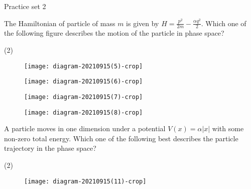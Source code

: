 \newpage
\begin{abox}
	Practice set 2
	\end{abox}
\begin{enumerate}
\begin{minipage}{\textwidth}
	\item The Hamiltonian of particle of mass $m$ is given by $H=\frac{p^{2}}{2 m}-\frac{\alpha q^{2}}{2}$. Which one of the following figure describes the motion of the particle in phase space?
\end{minipage}
\begin{tasks}(2)
	\task[\textbf{A.}]\begin{figure}[H]
		\centering
		\texttt{[image: diagram-20210915(5)-crop]}
	\end{figure}
	\task[\textbf{B.}]\begin{figure}[H]
		\centering
		\texttt{[image: diagram-20210915(6)-crop]}
	\end{figure}
	\task[\textbf{C.}]\begin{figure}[H]
		\centering
		\texttt{[image: diagram-20210915(7)-crop]}
	\end{figure}
	\task[\textbf{D.}]\begin{figure}[H]
		\centering
		\texttt{[image: diagram-20210915(8)-crop]}
	\end{figure}
\end{tasks}
\begin{minipage}{\textwidth}
	\item A particle moves in one dimension under a potential $V(x)=\alpha|x|$ with some non-zero total energy. Which one of the following best describes the particle trajectory in the phase space?
\end{minipage}
\begin{tasks}(2)
	\task[\textbf{A.}]\begin{figure}[H]
		\centering
		\texttt{[image: diagram-20210915(11)-crop]}
		

\end{figure}
\end{tasks}
\end{enumerate}

